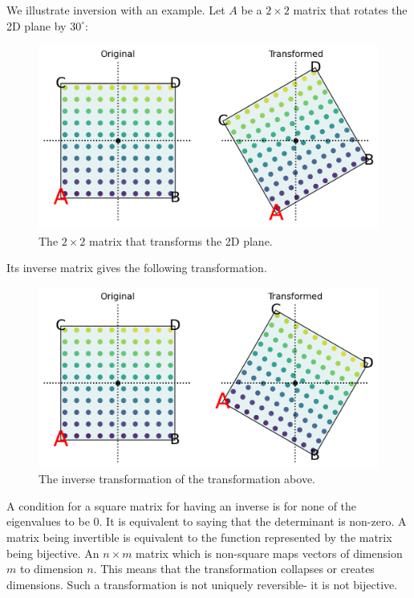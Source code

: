 \documentclass[a4paper, openany]{memoir}
\begin{document}
    We illustrate inversion with an example. Let $A$ be a $2 \times 2$ matrix that rotates the 2D plane by $30^{\circ}$:
    \begin{figure}[H]
        \centering
        \includegraphics[scale=0.4]{src/3.31 Inverse 2D transform Original.png}
        \caption{The $2 \times 2$ matrix that transforms the 2D plane.}
    \end{figure}
    \noindent Its inverse matrix gives the following transformation.
    \begin{figure}[H]
        \centering
        \includegraphics[scale=0.4]{src/3.32 Inverse 2D transform Inverse.png}
        \caption{The inverse transformation of the transformation above.}
    \end{figure}
    A condition for a square matrix for having an inverse is for none of the eigenvalues to be 0. It is equivalent to saying that the determinant is non-zero. A matrix being invertible is equivalent to the function represented by the matrix being bijective. An $n \times m$ matrix which is non-square maps vectors of dimension $m$ to dimension $n$. This means that the transformation collapses or creates dimensions. Such a transformation is not uniquely reversible- it is not bijective. 
    
\end{document}
